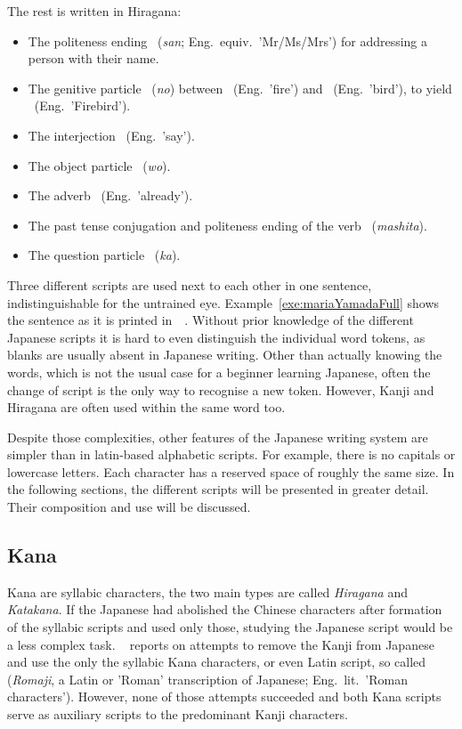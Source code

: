 The rest is written in Hiragana:
\begin{itemize}
  \item The politeness ending ~(\emph{san}; 
        Eng.\ equiv.\ 'Mr/Ms/Mrs') for addressing a person with their name.
  \item The genitive particle ~(\emph{no}) between 
        ~(Eng.\ 'fire') and ~(Eng.\ 'bird'), to yield 
        ~(Eng.\ 'Firebird').
  \item The interjection ~(Eng.\ 'say').
  \item The object particle ~(\emph{wo}).
  \item The adverb ~(Eng.\ 'already').
  \item The past tense conjugation and politeness ending of the 
        verb ~(\emph{mashita}).
  \item The question particle ~(\emph{ka}).
\end{itemize}

Three different scripts are used next to each other in one sentence,
indistinguishable for the untrained eye. Example~\ref{exe:mariaYamadaFull} 
shows the sentence as it is printed 
in~~\citeyear{Katsuki2006Book}. Without prior
knowledge of the different Japanese scripts it is hard to even distinguish
the individual word tokens, as blanks are usually absent in Japanese writing.
Other than actually knowing the words, which is not the usual case for a 
beginner learning Japanese, often the change of script is the only way to 
recognise a new token. However, Kanji and Hiragana are often used within the same
word too.

Despite those complexities, other features of the Japanese writing system are 
simpler than in latin-based alphabetic scripts. 
For example, there is no capitals or lowercase letters.
Each character has a reserved space of roughly the same size.
In the following sections, the different scripts will be presented in greater 
detail. Their composition and use will be discussed.

\subsection{Kana }
\label{sec:kana}

Kana are syllabic characters, the two main types are called \emph{Hiragana}
and \emph{Katakana}.
If the Japanese had abolished the Chinese characters after formation of the
syllabic scripts and used only those, studying the Japanese script would be
a less complex task.
~\citeyear{Lange1922} reports 
on attempts to remove the Kanji from Japanese and use the 
only the syllabic Kana characters, or even Latin script, 
so called  (\emph{Romaji}, a Latin or 'Roman' 
transcription of Japanese; Eng.\ lit.\ 'Roman characters'). 
However, none of those attempts succeeded and both Kana scripts serve as 
auxiliary scripts to the predominant Kanji characters. 

